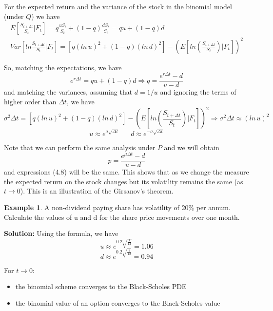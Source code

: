 \documentclass[11pt,a4paper]{book}
\theoremstyle{definition}\newtheorem{definition}{Definition}
\theoremstyle{definition}\newtheorem{fact}{Fact}
\theoremstyle{definition}\newtheorem{remark}{Remark}
\theoremstyle{definition}\newtheorem{ex}{Ex.}
\theoremstyle{definition}\newtheorem{project}{Project}
\theoremstyle{definition}\newtheorem{problem}{Problem}
\theoremstyle{definition}\newtheorem{example}{Example}
\numberwithin{theorem}{section}
\numberwithin{corollary}{chapter}
\numberwithin{assumption}{chapter}
\numberwithin{definition}{chapter}
\numberwithin{prop}{chapter}
\numberwithin{notation}{chapter}
\numberwithin{problem}{chapter}
\numberwithin{example}{chapter}
\numberwithin{fact}{chapter}
\numberwithin{ex}{chapter}
\begin{document}
For the expected return and the variance of the stock in the binomial model (under $Q$) we have
\begin{align}
E\left[ \frac{S_{t+\Delta t}}{S_t} | F_t \right] = q\frac{uS_t}{S_t} + (1-q)\frac{dS_t}{S_t} = qu + (1-q)d \nonumber \\
Var\left[ ln \frac{S_{t+\Delta t}}{S_t} | F_t \right] = [q(ln\,u)^2 + (1-q)(ln\,d)^2] - \left( E\left[ ln \left( \frac{S_{t+\Delta t}}{S_t} \right) | F_t \right] \right)^2
\end{align}

So, matching the expectations, we have
$$ e^{r \Delta t} = qu + (1-q)d \Longrightarrow q = \frac{e^{r\Delta t}-d}{u-d} $$
and matching the variances, assuming that $d = 1/u$ and ignoring the terms of higher order than $\Delta t$, we have
$$ \sigma^2 \Delta t = [q(ln\,u)^2 + (1-q) (ln\,d)^2] - \left( E\left[ ln \left( \frac{S_{t+\Delta t}}{S_t} \right) | F_t \right] \right)^2 \Longrightarrow \sigma^2 \Delta t \approx (ln\,u)^2 $$
\begin{equation}
u \approx e^{\sigma \sqrt{\Delta t}} \,\,\,\,\,\,\,\,\,\, d \approx e^{-\sigma \sqrt{\Delta t}}
\end{equation}

Note that we can perform the same analysis under $P$ and we will obtain
$$ p = \frac{e^{\mu \Delta t}-d}{u-d} $$
and expressions (4.8) will be the same. This shows that as we change the measure the expected return on the stock changes but its volatility remains the same (as $t \rightarrow 0$). This is an illustration of the Girsanov's theorem.

\begin{example}
A non-dividend paying share has volatility of 20\% per annum. Calculate the values of u and d for the share price movements over one month.

\vspace{15pt}
\textbf{Solution:}
Using the formula, we have
$$ u \approx e^{0.2 \sqrt{\frac{1}{12}}} = 1.06 $$
$$ d \approx e^{0.2 \sqrt{\frac{1}{12}}} = 0.94 $$
\end{example}

\vspace{20pt}
For $t \rightarrow 0$:
\begin{itemize}
\item the binomial scheme converges to the Black-Scholes PDE
\item the binomial value of an option converges to the Black-Scholes value
\end{itemize}
\end{document}
